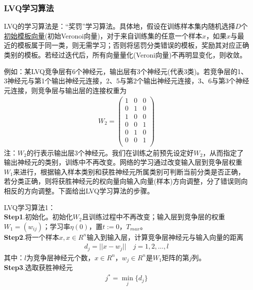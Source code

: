         \subsubsection{LVQ学习算法}
            \par
            LVQ的学习算法是：“奖罚”学习算法。具体地，假设在训练样本集内随机选择$D$个\uline{初始模板向量}(初始Veronoi向量)，对于来自训练集的任意一个样本$x$，如果$x$与最近的模板属于同一类，则无需学习；否则将惩罚分类错误的模板，奖励其对应正确类别的模板。若经过迭代后，所有向量量化(Veroni向量)不再明显变化，则收敛。
            \par
            例如：某LVQ竞争层有6个神经元，输出层有3个神经元(代表3类)。若竞争层的1、3神经元与第1个输出神经元连接，2、5与第2个输出神经元连接，3、6与第3个神经元连接，则竞争层与输出层的连接权重为
            \begin{align*}
            W_2 =
            \begin{pmatrix}
            1 & 0 & 0\\
            0 & 1 & 0\\
            1 & 0 & 0\\
            0 & 0 & 1\\
            0 & 1 & 0\\
            0 & 0 & 1\\
            \end{pmatrix}
            \end{align*}
            注：$W_2$的行表示输出层3个神经元。我们在训练之前预先设定好$W_2$，从而指定了输出神经元的类别，训练中不再改变。网络的学习通过改变输入层到竞争层权重$W_1$来进行，根据输入样本类别和获胜神经元所属类别可判断当前分类是否正确，若分类正确，则将获胜神经元的权向量向输入向量(样本)方向调整，分了错误则向相反的方向调整。下面给出LVQ学习算法的步骤。
            \par
            LVQ学习算法1：\\
            \textbf{Step1}.初始化。初始化$W_2$且训练过程中不再改变；输入层到竞争层的权重$W_1 = (w_{ij})$；学习率$\eta(0)$，置$t:=0$，$T_{max}$。\\
            \textbf{Step2}.将一个样本$x,x\in R^n$输入到输入层，计算竞争层神经元与输入向量的距离
            \begin{align*}
            d_j = ||x-w_j||\quad j = 1,2,\dots,l
            \end{align*}
            其中：$l$为竞争层神经元个数，$x\in R^n$，$w_j\in R^n$是$W_1$矩阵的第$j$列。\\
            \textbf{Step3}.选取获胜神经元
            \begin{align*}
            j^* = \min _j\{d_j\}
            \end{align*}
